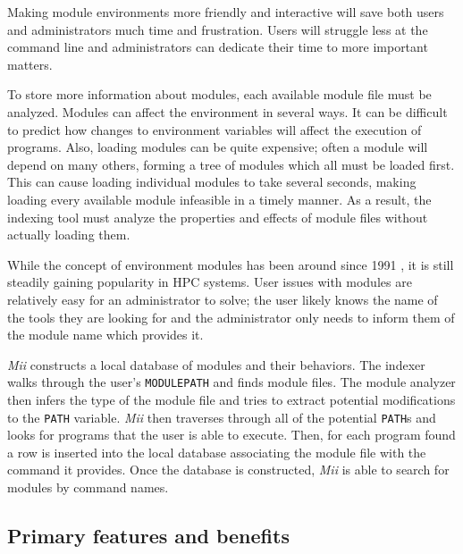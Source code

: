 \documentclass[manuscript,screen]{acmart}
\begin{document}
\par

Making module environments more friendly and interactive will save both users and administrators much
time and frustration. Users will struggle less at the command line and administrators can dedicate their
time to more important matters.

\par

To store more information about modules, each available module file must be analyzed. Modules can affect
the environment in several ways. It can be difficult to predict how changes to environment variables will
affect the execution of programs. Also, loading modules can be quite expensive; often a module will depend
on many others, forming a tree of modules which all must be loaded first. This can cause loading individual
modules to take several seconds, making loading every available module infeasible in a timely manner.
As a result, the indexing tool must analyze the properties and effects of module files without actually loading
them.

\par

While the concept of environment modules has been around since 1991 \cite{TclPaper}, it is still steadily gaining
popularity in HPC systems. User issues with modules are relatively easy for an administrator to solve; the
user likely knows the name of the tools they are looking for and the administrator only needs to inform
them of the module name which provides it.

\par

\textit{Mii} constructs a local database of modules and their behaviors. The indexer walks through the user’s
\texttt{MODULEPATH} and finds module files. The module analyzer then infers the type of the module file and tries to
extract potential modifications to the \texttt{PATH} variable. \textit{Mii} then traverses through all of the potential \texttt{PATH}s
and looks for programs that the user is able to execute. Then, for each program found a row is inserted
into the local database associating the module file with the command it provides. Once the database is
constructed, \textit{Mii} is able to search for modules by command names.

\subsection{Primary features and benefits}
\end{document}
